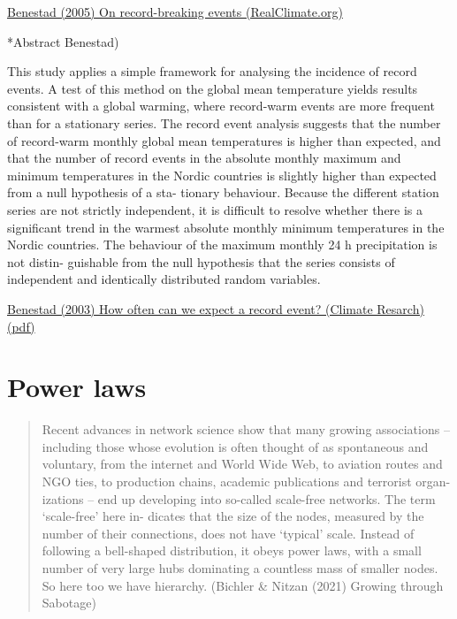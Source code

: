 \documentclass[
]{book}
\begin{document}
\href{https://www.realclimate.org/index.php/archives/2005/08/on-record-high-temperatures/}{Benestad (2005) On record-breaking events (RealClimate.org)}

*Abstract Benestad)

This study applies a simple framework for analysing the incidence of record events. A
test of this method on the global mean temperature yields results consistent with a global warming,
where record-warm events are more frequent than for a stationary series. The record event analysis
suggests that the number of record-warm monthly global mean temperatures is higher than
expected, and that the number of record events in the absolute monthly maximum and minimum
temperatures in the Nordic countries is slightly higher than expected from a null hypothesis of a sta-
tionary behaviour. Because the different station series are not strictly independent, it is difficult to
resolve whether there is a significant trend in the warmest absolute monthly minimum temperatures
in the Nordic countries. The behaviour of the maximum monthly 24 h precipitation is not distin-
guishable from the null hypothesis that the series consists of independent and identically distributed
random variables.

\href{pdf/Benestad_2003_How_often_record_event.pdf}{Benestad (2003) How often can we expect a record event? (Climate Resarch) (pdf)}

\hypertarget{power-laws}{%
\chapter{Power laws}\label{power-laws}}

\begin{quote}
Recent advances in
network science show that many growing associations -- including those whose evolution is
often thought of as spontaneous and voluntary, from the internet and World Wide Web, to
aviation routes and NGO ties, to production chains, academic publications and terrorist organ-
izations -- end up developing into so-called scale-free networks. The term `scale-free' here in-
dicates that the size of the nodes, measured by the number of their connections, does not have
`typical' scale. Instead of following a bell-shaped distribution, it obeys power laws, with a small
number of very large hubs dominating a countless mass of smaller nodes. So here too we have
hierarchy. (Bichler \& Nitzan (2021) Growing through Sabotage)
\end{quote}
\end{document}
